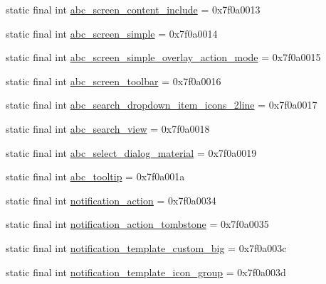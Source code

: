 \begin{DoxyCompactItemize}
\item 
static final int \mbox{\hyperlink{classandroid_1_1support_1_1v7_1_1appcompat_1_1_r_1_1layout_a1193e05438a3988d8cebb0a4810fabc1}{abc\+\_\+screen\+\_\+content\+\_\+include}} = 0x7f0a0013
\item 
static final int \mbox{\hyperlink{classandroid_1_1support_1_1v7_1_1appcompat_1_1_r_1_1layout_a46cabee4c1c1c293c63a99e850973847}{abc\+\_\+screen\+\_\+simple}} = 0x7f0a0014
\item 
static final int \mbox{\hyperlink{classandroid_1_1support_1_1v7_1_1appcompat_1_1_r_1_1layout_acc248e0178ddf81d8ec0eb5056424a5d}{abc\+\_\+screen\+\_\+simple\+\_\+overlay\+\_\+action\+\_\+mode}} = 0x7f0a0015
\item 
static final int \mbox{\hyperlink{classandroid_1_1support_1_1v7_1_1appcompat_1_1_r_1_1layout_addd57f53331cb1ff5fd2c53e61bf2805}{abc\+\_\+screen\+\_\+toolbar}} = 0x7f0a0016
\item 
static final int \mbox{\hyperlink{classandroid_1_1support_1_1v7_1_1appcompat_1_1_r_1_1layout_a43434db42002b5872fd031eaaea46488}{abc\+\_\+search\+\_\+dropdown\+\_\+item\+\_\+icons\+\_\+2line}} = 0x7f0a0017
\item 
static final int \mbox{\hyperlink{classandroid_1_1support_1_1v7_1_1appcompat_1_1_r_1_1layout_a424314fba766e6fc9c6e6b71ccc00fff}{abc\+\_\+search\+\_\+view}} = 0x7f0a0018
\item 
static final int \mbox{\hyperlink{classandroid_1_1support_1_1v7_1_1appcompat_1_1_r_1_1layout_a1f6651d158db2337019984ab97f60e22}{abc\+\_\+select\+\_\+dialog\+\_\+material}} = 0x7f0a0019
\item 
static final int \mbox{\hyperlink{classandroid_1_1support_1_1v7_1_1appcompat_1_1_r_1_1layout_a20cae5f2a4ee56a5e5c0b1e75a9559be}{abc\+\_\+tooltip}} = 0x7f0a001a
\item 
static final int \mbox{\hyperlink{classandroid_1_1support_1_1v7_1_1appcompat_1_1_r_1_1layout_afe7cf82e60de09f99402960853d3ee0f}{notification\+\_\+action}} = 0x7f0a0034
\item 
static final int \mbox{\hyperlink{classandroid_1_1support_1_1v7_1_1appcompat_1_1_r_1_1layout_a65fed226da4d733de3068d4a15cc5b55}{notification\+\_\+action\+\_\+tombstone}} = 0x7f0a0035
\item 
static final int \mbox{\hyperlink{classandroid_1_1support_1_1v7_1_1appcompat_1_1_r_1_1layout_a3207d2343821a6e1822345fbff858699}{notification\+\_\+template\+\_\+custom\+\_\+big}} = 0x7f0a003c
\item 
static final int \mbox{\hyperlink{classandroid_1_1support_1_1v7_1_1appcompat_1_1_r_1_1layout_ab83401c918fc5f08cbb6820f8587ae41}{notification\+\_\+template\+\_\+icon\+\_\+group}} = 0x7f0a003d

\end{DoxyCompactItemize}
